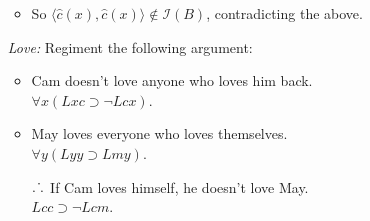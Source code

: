 \documentclass[a4paper, 11pt]{article} %
\newcommand{\tuple}[1]{\langle#1\rangle} %
\def\therefore{\ensuremath{\ldotp\dot\,\ldotp}}
\newcommand{\I}{\mathcal{I}}
\newcommand{\M}{\mathcal{M}}
\newcommand{\D}{\mathbb{D}}
\newcommand{\VV}[2]{\mathcal{V}_{#1}^{#2}} %
\begin{document}
\begin{enumerate}
\begin{itemize}
      \item So $\tuple{\hat{c}(x),\hat{c}(x)}\notin\I(B)$, contradicting the above.
    \end{itemize}
  \item[\it Love:] Regiment the following argument:
    \begin{itemize}
      \item Cam doesn't love anyone who loves him back.\\
        $\forall x(Lxc \supset \neg Lcx)$.
      \item May loves everyone who loves themselves.\\
        $\forall y(Lyy \supset Lmy)$.
      \item[\therefore] If Cam loves himself, he doesn't love May.\\
        $Lcc \supset \neg Lcm$.
    \end{itemize}

\end{enumerate}
\end{document}
